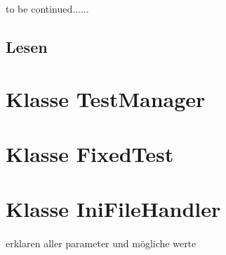 to be continued......


\subsection{Lesen}
\paragraph{}

\newpage


\section{Klasse TestManager}
\paragraph{}

\subsection{}

\newpage


\section{Klasse FixedTest}
\paragraph{}

\subsection{}

\newpage


\section{Klasse IniFileHandler}\label{IniFileHandler}
\paragraph{}
erklaren aller parameter und mögliche werte

